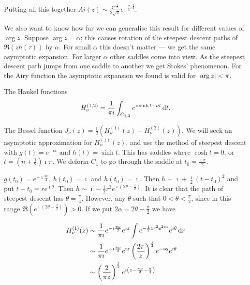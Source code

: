 \documentclass{notes}
\theoremstyle{plain}
\begin{document}
Putting all this together $Ai(z) \sim \frac{z^{-\frac{1}{4}}}{2 \sqrt{\pi}}
e^{-\frac{2}{3}z^{\frac{3}{2}}}$.

We also want to know how far we can generalise this result for
different values of $\arg z$.  Suppose $\arg z = \alpha$; this causes
rotation of the steepest descent paths of $\Re \left(z h(\tau)\right)$
by $\alpha$.  For small $\alpha$ this doesn't matter --- we get the
same asymptotic expansion.  For larger $\alpha$ other saddles come
into view.  As the steepest descent path jumps from one saddle to
another we get Stokes' phenomenon.  For the Airy function the
asymptotic expansion we found is valid for $\left|\arg z\right| < \pi$.

\vspace{1in}

The Hankel functions
\[
H^{(1,2)}_\nu = \frac{1}{\pi \imath} \int_{C_{1,2}}
e^{z \sinh t - \nu t}\, \mathrm{d} t.
\]

The Bessel function $J_\nu(z) = \frac{1}{2} \left( H^{(1)}_\nu(z)
+ H^{(2)}_\nu(z) \right)$.  We will seek an asymptotic approximation for
$H^{(1)}_\nu(z)$, and use the method of steepest descent with
$g(t) = e^{-\nu t}$ and $h(t) = \sinh t$. This has saddles where
$\cosh t = 0$, or $t = \left( n + \frac{1}{2} \right) \imath \pi$.  We
deform $C_1$ to go through the saddle at $t_0 = \frac{\imath \pi}{2}$.

$g(t_0) = e^{-\imath \frac{\pi \nu}{2}}$, $h(t_0) = \imath$ and
$h(t_0) = \imath$.  Then $h \sim \imath  + \frac{\imath}{2} \left(t - t_0
\right)^2$ and put $t - t_0 = r e^{\imath \theta}$.  Then
$h \sim \imath - \frac{1}{2} r^2 e^{\imath \left(2 \theta - \frac{\pi}{2}
\right)}$.  It is clear that the path of steepest descent has
$\theta = \frac{\pi}{4}$.  However, any $\theta$ such that $0 < \theta
< \frac{\pi}{2}$, since in this range $\Re \left( e^{\imath \left(
2 \theta - \frac{\pi}{2}\right)} \right) > 0$.  If we put $2 \alpha
= 2 \theta - \frac{\pi}{2}$ we have

\begin{align*}
H^{(1)}_\nu(z) & \sim \frac{1}{\pi \imath} e^{-\imath \frac{\pi \nu}{2}}
e^{\imath z} \int e^{-\frac{1}{2} z r^2 e^{2 \imath \alpha}} e^{\imath \theta}
\, \mathrm{d} r \\
& \sim \frac{1}{\pi \imath} e^{-\imath \frac{\pi \nu}{2}} e^{\imath z}
\left( \frac{2 \pi}{z} \right)^{\frac{1}{2}} e^{-\imath \alpha} e^{\imath
\theta} \\
& \sim \left(\frac{2}{\pi z}\right)^{\frac{1}{2}} e^{\imath \left(
z - \frac{\pi \nu}{2} - \frac{\pi}{4} \right)}
\end{align*}
\end{document}
